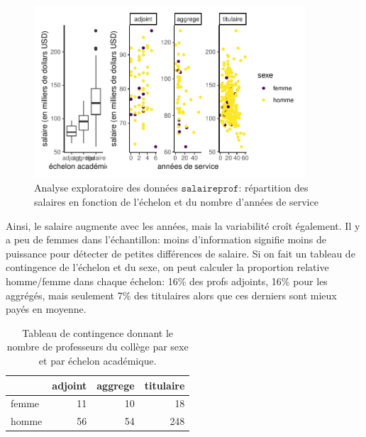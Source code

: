 \documentclass[
  11pt,
  letterpaper,
]{scrbook}
\theoremstyle{definition}
\theoremstyle{remark}
\begin{document}
\begin{figure}[ht!]

{\centering \includegraphics[width=0.9\textwidth,height=\textheight]{rappel-regressionlineaire_files/figure-pdf/fig-edacollege-1.pdf}

}

\caption{\label{fig-edacollege}Analyse exploratoire des données
\(\texttt{salaireprof}\): répartition des salaires en fonction de
l'échelon et du nombre d'années de service}

\end{figure}

Ainsi, le salaire augmente avec les années, mais la variabilité croît
également. Il y a peu de femmes dans l'échantillon: moins d'information
signifie moins de puissance pour détecter de petites différences de
salaire. Si on fait un tableau de contingence de l'échelon et du sexe,
on peut calculer la proportion relative homme/femme dans chaque échelon:
16\% des profs adjoints, 16\% pour les aggrégés, mais seulement 7\% des
titulaires alors que ces derniers sont mieux payés en moyenne.

\hypertarget{tbl-tableaucontingence}{}
\begin{table}
\caption{\label{tbl-tableaucontingence}Tableau de contingence donnant le nombre de professeurs du collège par
sexe et par échelon académique. }\tabularnewline

\centering
\begin{tabular}{lrrr}
\toprule
  & adjoint & aggrege & titulaire\\
\midrule
femme & 11 & 10 & 18\\
homme & 56 & 54 & 248\\
\bottomrule
\end{tabular}
\end{table}
\end{document}

